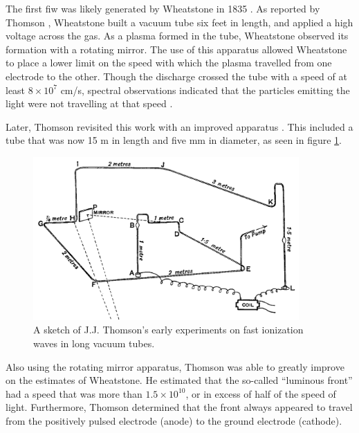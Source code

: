The first \acs{fiw} was likely generated by Wheatstone in 1835
\cite{Wheatstone1835}. As reported by Thomson \cite{Thomson1893}, Wheatstone
built a vacuum tube six feet in length, and applied a high voltage across the
gas. As a plasma formed in the tube, Wheatstone observed its formation with a
rotating mirror. The use of this apparatus allowed Wheatstone to place a lower
limit on the speed with which the plasma travelled from one electrode to the
other. Though the discharge crossed the tube with a speed of at least
$8\times10^7$ cm/s, spectral observations indicated that the particles emitting
the light were not travelling at that speed \cite{Zahn1879}.

Later, Thomson revisited this work with an improved apparatus
\cite{Thomson1893}. This included a tube that was now 15 m in length and five mm
in diameter, as seen in figure \ref{fig:thomson}.
\begin{figure}
  \centering
  \includegraphics[width=4in]{chapters/introduction/figures/thomson.png}
  \caption{A sketch of J.J. Thomson's early experiments on fast ionization
  waves in long vacuum tubes.}\label{fig:thomson}
\end{figure}
Also using the rotating mirror apparatus, Thomson was able to greatly improve on
the estimates of Wheatstone. He estimated that the so-called ``luminous front''
had a speed that was more than $1.5\times10^{10}$, or in excess of half of the
speed of light. Furthermore, Thomson determined that the front always appeared
to travel from the positively pulsed electrode (anode) to the ground electrode
(cathode).

